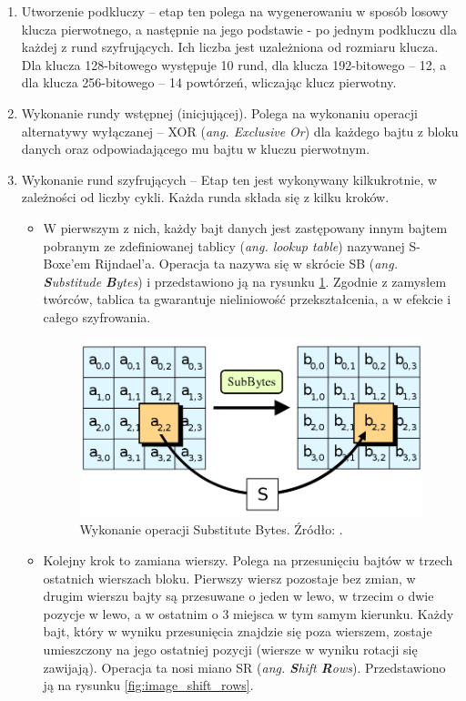 \begin{enumerate}
\item  Utworzenie podkluczy – etap ten polega na wygenerowaniu w sposób losowy klucza pierwotnego, a następnie na jego podstawie - po jednym podkluczu dla każdej z rund szyfrujących. Ich liczba jest uzależniona od rozmiaru klucza. Dla klucza 128-bitowego występuje 10 rund, dla klucza 192-bitowego – 12, a dla klucza 256-bitowego – 14 powtórzeń, wliczając klucz pierwotny.

\item Wykonanie rundy wstępnej (inicjującej). Polega na wykonaniu operacji alternatywy wyłączanej – XOR (\textit{ang. Exclusive Or}) dla każdego bajtu z bloku danych oraz odpowiadającego mu bajtu w kluczu pierwotnym.

\item Wykonanie rund szyfrujących – Etap ten jest wykonywany kilkukrotnie, w zależności od liczby cykli. Każda runda składa się z kilku kroków. 

	\begin{itemize}
	\item W pierwszym z nich, każdy bajt danych jest zastępowany innym bajtem pobranym ze zdefiniowanej tablicy (\textit{ang. lookup table}) nazywanej S-Boxe’em Rijndael’a. Operacja ta nazywa się w skrócie SB (\textit{ang. \textbf{S}ubstitude \textbf{B}ytes}) i przedstawiono ją na rysunku \ref{fig:image_substitute_bytes}. Zgodnie z zamysłem twórców, tablica ta gwarantuje nieliniowość przekształcenia, a w efekcie i całego szyfrowania.
	
	\begin{figure}[h]
		\centering
		\includegraphics[width=10cm]{img/com_security/800px-AES-SubBytes.png}
		\caption{Wykonanie operacji Substitute Bytes. Źródło: \cite{aes_wiki}.}
		\label{fig:image_substitute_bytes}
	\end{figure}

	\item  Kolejny krok to zamiana wierszy. Polega na przesunięciu bajtów w trzech ostatnich wierszach bloku. Pierwszy wiersz pozostaje bez zmian, w drugim wierszu bajty są przesuwane o jeden w lewo, w trzecim o dwie pozycje w lewo, a w ostatnim o 3 miejsca w tym samym kierunku. Każdy bajt, który w wyniku przesunięcia znajdzie się poza wierszem, zostaje umieszczony na jego ostatniej pozycji (wiersze w wyniku rotacji się zawijają). Operacja ta nosi miano SR (\textit{ang. \textbf{S}hift \textbf{R}ows}). Przedstawiono ją na rysunku \ref{fig:image_shift_rows}.
	

\end{itemize}
\end{enumerate}
